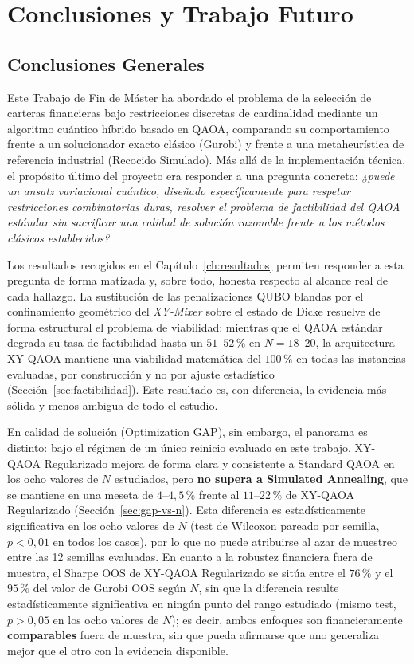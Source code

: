 \chapter{Conclusiones y Trabajo Futuro}
\label{chap:conclusiones}

\section{Conclusiones Generales}
\label{sec:conclusiones_generales}

Este Trabajo de Fin de Máster ha abordado el problema de la selección de carteras financieras bajo restricciones
discretas de cardinalidad mediante un algoritmo cuántico híbrido basado en QAOA, comparando su comportamiento
frente a un solucionador exacto clásico (Gurobi) y frente a una metaheurística de referencia industrial (Recocido
Simulado). Más allá de la implementación técnica, el propósito último del proyecto era responder a una pregunta
concreta: \emph{¿puede un ansatz variacional cuántico, diseñado específicamente para respetar restricciones
combinatorias duras, resolver el problema de factibilidad del QAOA estándar sin sacrificar una calidad de
solución razonable frente a los métodos clásicos establecidos?}

Los resultados recogidos en el Capítulo~\ref{ch:resultados} permiten responder a esta pregunta de forma matizada
y, sobre todo, honesta respecto al alcance real de cada hallazgo. La sustitución de las penalizaciones QUBO
blandas por el confinamiento geométrico del \emph{XY-Mixer} sobre el estado de Dicke resuelve de forma estructural
el problema de viabilidad: mientras que el QAOA estándar degrada su tasa de factibilidad hasta un
$51\text{--}52\,\%$ en $N=18\text{--}20$, la arquitectura XY-QAOA mantiene una viabilidad matemática del
$100\,\%$ en todas las instancias evaluadas, por construcción y no por ajuste estadístico
(Sección~\ref{sec:factibilidad}). Este resultado es, con diferencia, la evidencia más sólida y menos ambigua
de todo el estudio.

En calidad de solución (Optimization GAP), sin embargo, el panorama es distinto: bajo el régimen de un único
reinicio evaluado en este trabajo, XY-QAOA Regularizado mejora de forma clara y consistente a Standard QAOA en
los ocho valores de $N$ estudiados, pero \textbf{no supera a Simulated Annealing}, que se mantiene en una meseta
de $4\text{--}4{,}5\,\%$ frente al $11\text{--}22\,\%$ de XY-QAOA Regularizado (Sección~\ref{sec:gap-vs-n}). Esta
diferencia es estadísticamente significativa en los ocho valores de $N$ (test de Wilcoxon pareado por semilla,
$p<0{,}01$ en todos los casos), por lo que no puede atribuirse al azar de muestreo entre las 12 semillas
evaluadas. En cuanto a la robustez financiera fuera de muestra, el Sharpe OOS de XY-QAOA Regularizado se sitúa
entre el $76\,\%$ y el $95\,\%$ del valor de Gurobi OOS según $N$, sin que la diferencia resulte
estadísticamente significativa en ningún punto del rango estudiado (mismo test, $p>0{,}05$ en los ocho valores
de $N$); es decir, ambos enfoques son financieramente \textbf{comparables} fuera de muestra, sin que pueda
afirmarse que uno generaliza mejor que el otro con la evidencia disponible.

